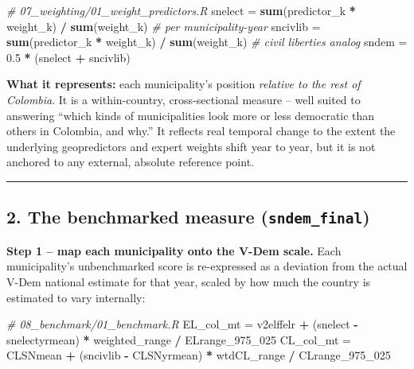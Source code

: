 \documentclass[
]{article}
\newenvironment{Shaded}{\begin{snugshade}}{\end{snugshade}}
\newcommand{\CommentTok}[1]{\textcolor[rgb]{0.56,0.35,0.01}{\textit{#1}}}
\newcommand{\FloatTok}[1]{\textcolor[rgb]{0.00,0.00,0.81}{#1}}
\newcommand{\FunctionTok}[1]{\textcolor[rgb]{0.13,0.29,0.53}{\textbf{#1}}}
\newcommand{\NormalTok}[1]{#1}
\newcommand{\OtherTok}[1]{\textcolor[rgb]{0.56,0.35,0.01}{#1}}
\newcommand{\SpecialCharTok}[1]{\textcolor[rgb]{0.81,0.36,0.00}{\textbf{#1}}}
\begin{document}
\begin{Shaded}
\begin{Highlighting}[]
\CommentTok{\# 07\_weighting/01\_weight\_predictors.R}
\NormalTok{snelect  }\OtherTok{=} \FunctionTok{sum}\NormalTok{(predictor\_k }\SpecialCharTok{*}\NormalTok{ weight\_k) }\SpecialCharTok{/} \FunctionTok{sum}\NormalTok{(weight\_k)   }\CommentTok{\# per municipality{-}year}
\NormalTok{sncivlib }\OtherTok{=} \FunctionTok{sum}\NormalTok{(predictor\_k }\SpecialCharTok{*}\NormalTok{ weight\_k) }\SpecialCharTok{/} \FunctionTok{sum}\NormalTok{(weight\_k)   }\CommentTok{\# civil liberties analog}
\NormalTok{sndem    }\OtherTok{=} \FloatTok{0.5} \SpecialCharTok{*}\NormalTok{ (snelect }\SpecialCharTok{+}\NormalTok{ sncivlib)}
\end{Highlighting}
\end{Shaded}

\textbf{What it represents:} each municipality's position \emph{relative
to the rest of Colombia}. It is a within-country, cross-sectional
measure -- well suited to answering ``which kinds of municipalities look
more or less democratic than others in Colombia, and why.'' It reflects
real temporal change to the extent the underlying geopredictors and
expert weights shift year to year, but it is not anchored to any
external, absolute reference point.

\begin{center}\rule{0.5\linewidth}{0.5pt}\end{center}

\hypertarget{the-benchmarked-measure-sndem_final}{%
\subsection{\texorpdfstring{2. The benchmarked measure
(\texttt{sndem\_final})}{2. The benchmarked measure (sndem\_final)}}\label{the-benchmarked-measure-sndem_final}}

\textbf{Step 1 -- map each municipality onto the V-Dem scale.} Each
municipality's unbenchmarked score is re-expressed as a deviation from
the actual V-Dem national estimate for that year, scaled by how much the
country is estimated to vary internally:

\begin{Shaded}
\begin{Highlighting}[]
\CommentTok{\# 08\_benchmark/01\_benchmark.R}
\NormalTok{EL\_col\_mt }\OtherTok{=}\NormalTok{ v2elffelr }\SpecialCharTok{+}\NormalTok{ (snelect  }\SpecialCharTok{{-}}\NormalTok{ snelectyrmean) }\SpecialCharTok{*}\NormalTok{ weighted\_range }\SpecialCharTok{/}\NormalTok{ ELrange\_975\_025}
\NormalTok{CL\_col\_mt }\OtherTok{=}\NormalTok{ CLSNmean  }\SpecialCharTok{+}\NormalTok{ (sncivlib }\SpecialCharTok{{-}}\NormalTok{ CLSNyrmean)   }\SpecialCharTok{*}\NormalTok{ wtdCL\_range   }\SpecialCharTok{/}\NormalTok{ CLrange\_975\_025}
\end{Highlighting}
\end{Shaded}
\end{document}
